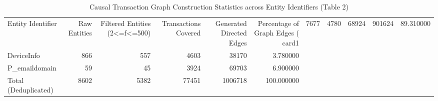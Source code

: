 \begin{table}
\caption{Causal Transaction Graph Construction Statistics across Entity Identifiers (Table 2)}
\label{tab:edge_stats}
\begin{tabular}{lrrrrr}
\toprule
Entity Identifier & Raw Entities & Filtered Entities (2<=f<=500) & Transactions Covered & Generated Directed Edges & Percentage of Graph Edges (%
\midrule
card1 & 7677 & 4780 & 68924 & 901624 & 89.310000 \\
DeviceInfo & 866 & 557 & 4603 & 38170 & 3.780000 \\
P_emaildomain & 59 & 45 & 3924 & 69703 & 6.900000 \\
Total (Deduplicated) & 8602 & 5382 & 77451 & 1006718 & 100.000000 \\
\bottomrule
\end{tabular}
\end{table}
